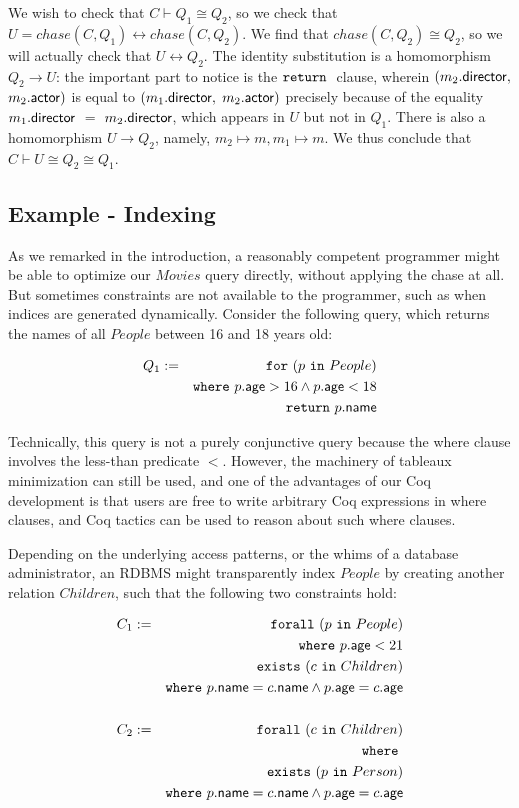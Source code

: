 \documentclass[preprint]{sigplanconf}
\newcommand{\FOR}{{\tt for} \ }
\newcommand{\FORALL}{{\tt forall} \ }
\newcommand{\EXISTS}{{\tt exists} \ }
\newcommand{\WHERE}{{\tt where} \ }
\newcommand{\IN}{ \ {\tt in} \ }
\newcommand{\RETURN}{{\tt return} \ }
\begin{document}
We wish to check that $C \vdash Q_1 \cong Q_2$, so we check that $U = chase(C,Q_1) \leftrightarrow chase(C, Q_2)$.  We find that $chase(C, Q_2) \cong Q_2$, so we will actually check that  $U \leftrightarrow Q_2$.  The identity substitution is a homomorphism $Q_2 \to U$: the important part to notice is the $\RETURN$ clause, wherein $(m_2.{\sf director},$ $m_2.{\sf actor})$ is equal to $(m_1.{\sf director},$ $m_2.{\sf actor})$ precisely because 
of the equality $m_1.{\sf director}$ $=$ $m_2.{\sf director}$, which appears in $U$ 
but not in $Q_1$.  There is also a homomorphism $U \to Q_2$, namely, $m_2 
\mapsto m, m_1 \mapsto m$.  We thus conclude that $C \vdash U \cong Q_2 \cong Q_1$. 
\newpage
\subsection*{Example - Indexing}

As we remarked in the introduction, a reasonably competent programmer might be able to optimize our $Movies$ query directly, without applying the chase at all.  But sometimes constraints are not available to the programmer, such as when indices are generated dynamically.  Consider the following query, which returns the names of all $People$ between 16 and 18 years old:
\begin{normalsize}
\begin{eqnarray*}
Q_1 & := & \FOR (p \IN People) \\
 & & \WHERE p.{\sf age} > 16 \wedge p.{\sf age} < 18 \\
 & & \RETURN p.{\sf name}
\end{eqnarray*}   
\end{normalsize}
Technically, this query is not a purely conjunctive query because the where clause involves the less-than predicate $<$.  However, the machinery of tableaux minimization can still be used, and one of the advantages of our Coq development is that users are free to write arbitrary Coq expressions in where clauses, and Coq tactics can be used to reason about such where clauses.
  
Depending on the underlying access patterns, or the whims of a database administrator, an RDBMS might transparently index $People$ by creating another relation $Children$, such that the following two constraints hold:
\begin{normalsize}
\begin{eqnarray*}
C_1 & := & \FORALL (p \IN People) \\
 & & \WHERE p.{\sf age} < 21 \\
 & & \EXISTS (c \IN Children) \\
 & & \WHERE p.{\sf name} = c.{\sf name} \wedge p.{\sf age} = c.{\sf age}  \\
 & & \\
  C_2 & := & \FORALL (c \IN Children) \\
  & & \WHERE \\
 & & \EXISTS (p \IN Person) \\
 & & \WHERE p.{\sf name} = c.{\sf name} \wedge p.{\sf age} = c.{\sf age}
\end{eqnarray*}       
\end{normalsize}
\end{document}
